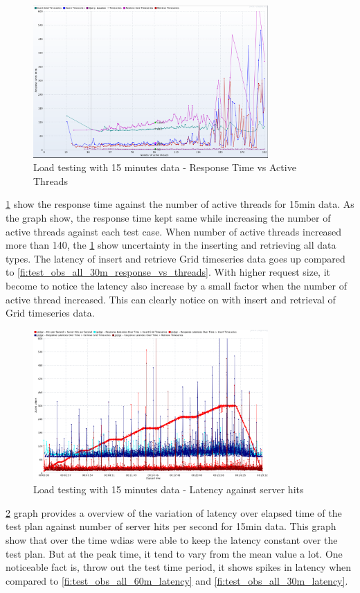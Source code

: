 \begin{figure}[htp]
    \centering
    \includegraphics[width=0.8\textwidth]{results/obs/all/obs_all_15m_response_times_vs_threads.png}
    \caption{Load testing with 15 minutes data - Response Time vs Active Threads}
    \label{fi:test_obs_all_15m_response_vs_threads}
\end{figure}
\ref{fi:test_obs_all_15m_response_vs_threads} show the response time against the number of active threads for 15min data. As the graph show, the response time kept same while increasing the number of active threads against each test case. When number of active threads increased more than 140, the \ref{fi:test_obs_all_15m_response_vs_threads} show uncertainty in the inserting and retrieving all data types. The latency of insert and retrieve Grid timeseries data goes up compared to \ref{fi:test_obs_all_30m_response_vs_threads}.
With higher request size, it become to notice the latency also increase by a small factor when the number of active thread increased. This can clearly notice on with insert and retrieval of Grid timeseries data.

\begin{figure}[htp]
    \centering
    \includegraphics[width=0.8\textwidth]{results/obs/all/obs_all_15m_res_latencies_against_hits.png}
    \caption{Load testing with 15 minutes data - Latency against server hits}
    \label{fi:test_obs_all_15m_latency}
\end{figure}
\ref{fi:test_obs_all_15m_latency} graph provides a overview of the variation of latency over elapsed time of the test plan against number of server hits per second for 15min data.
This graph show that over the time \acrshort{wdias} were able to keep the latency constant over the test plan. But at the peak time, it tend to vary from the mean value a lot.
One noticeable fact is, throw out the test time period, it shows spikes in latency when compared to \ref{fi:test_obs_all_60m_latency} and \ref{fi:test_obs_all_30m_latency}.

